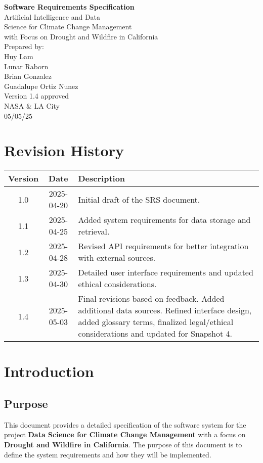 \documentclass[12pt]{article}
\begin{document}
\begin{flushright}
\Huge \textbf{Software Requirements Specification} \\[2em]
\color{blue}
\LARGE Artificial Intelligence and Data\\
Science for Climate Change Management\\
with Focus on Drought and Wildfire in California\\[2em]
\color{black}
\large Prepared by:\\
Huy Lam\\
Lunar Raborn\\
Brian Gonzalez\\
Guadalupe Ortiz Nunez\\[1em]
Version 1.4 approved\\
NASA \& LA City\\
05/05/25
\end{flushright}
\newpage

\tableofcontents
\newpage

\section*{Revision History}
\begin{longtable}{|c|c|p{3in}|}
\hline
\textbf{Version} & \textbf{Date} & \textbf{Description} \\
\hline
1.0 & 2025-04-20 & Initial draft of the SRS document. \\
\hline
1.1 & 2025-04-25 & Added system requirements for data storage and retrieval. \\
\hline
1.2 & 2025-04-28 & Revised API requirements for better integration with external sources. \\
\hline
1.3 & 2025-04-30 & Detailed user interface requirements and updated ethical considerations. \\
\hline
1.4 & 2025-05-03 & Final revisions based on feedback. Added additional data sources. Refined interface design, added glossary terms, finalized legal/ethical considerations and updated for Snapshot 4. \\
\hline
\end{longtable}
\newpage

\section{Introduction}
\subsection{Purpose}
This document provides a detailed specification of the software system for the project \textbf{Data Science for Climate Change Management} with a focus on \textbf{Drought and Wildfire in California}. The purpose of this document is to define the system requirements and how they will be implemented.
\end{document}
